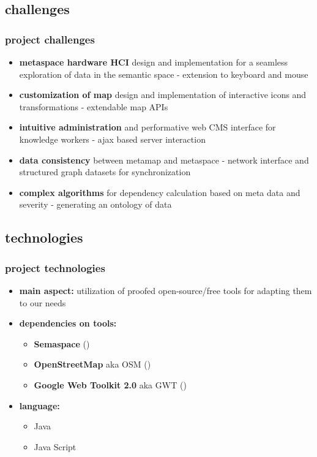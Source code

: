 \documentclass[blue]{beamer}
\begin{document}
\subsection{challenges}
\frame
{
\frametitle{\textbf{project challenges}}
\begin{itemize}
	\item \textbf{metaspace hardware HCI} design and implementation for a seamless exploration of data in the semantic space - extension to keyboard and mouse 
	\item \textbf{customization of map} design and implementation of interactive icons and transformations -  extendable map APIs
	\item \textbf{intuitive administration} and performative web CMS interface for knowledge workers - ajax based server interaction
	\item \textbf{data consistency} between metamap and metaspace - network interface and structured graph datasets for synchronization
	\item \textbf{complex algorithms} for dependency calculation based on meta data and severity - generating an ontology of data
\end{itemize}
}


\subsection{technologies}
\frame
{
\frametitle{\textbf{project technologies}}
\begin{itemize}
\item \textbf{main aspect:} utilization of proofed open-source/free tools for adapting them to our needs  
\item \textbf{dependencies on tools:}
  \begin{itemize}
    \item \textbf{Semaspace} ()
    \item \textbf{OpenStreetMap} aka OSM ()
    \item \textbf{Google Web Toolkit 2.0} aka GWT ()
  \end{itemize}
\item \textbf{language:}
	\begin{itemize}
		\item Java
		\item Java Script
	\end{itemize}
\end{itemize}
}
\end{document}
